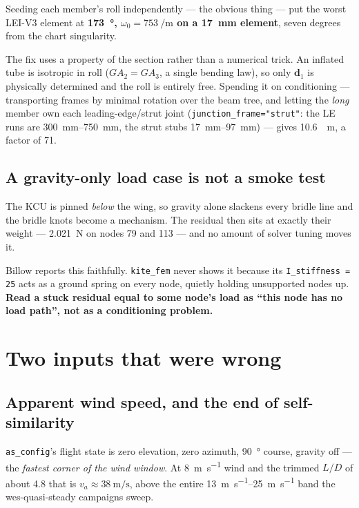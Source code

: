 \documentclass[11pt,a4paper]{article}
\newcommand{\code}[1]{\texttt{\small #1}}
\begin{document}
Seeding each member's roll independently --- the obvious thing --- put the worst
LEI-V3 element at \textbf{\SI{173}{\degree}, $\omega_0 = \SI{753}{\per\metre}$
on a \SI{17}{\milli\metre} element}, seven degrees from the chart singularity.

The fix uses a property of the section rather than a numerical trick. An
inflated tube is isotropic in roll ($GA_2 = GA_3$, a single bending law), so
only $\mathbf{d}_1$ is physically determined and the roll is entirely free.
Spending it on conditioning --- transporting frames by minimal rotation over the
beam tree, and letting the \emph{long} member own each leading-edge/strut joint
(\code{junction\_frame="strut"}: the LE runs are \SIrange{300}{750}{\milli\metre},
the strut stubs \SIrange{17}{97}{\milli\metre}) --- gives
\SI{10.6}{\per\metre}, a factor of 71.

\subsection{A gravity-only load case is not a smoke test}

The KCU is pinned \emph{below} the wing, so gravity alone slackens every bridle
line and the bridle knots become a mechanism. The residual then sits at exactly
their weight --- \SI{2.021}{\newton} on nodes 79 and 113 --- and no amount of
solver tuning moves it.

Billow reports this faithfully. \code{kite\_fem} never shows it because its
\code{I\_stiffness = 25} acts as a ground spring on every node, quietly holding
unsupported nodes up. \textbf{Read a stuck residual equal to some node's load as
``this node has no load path'', not as a conditioning problem.}

\section{Two inputs that were wrong}

\subsection{Apparent wind speed, and the end of self-similarity}
\label{sec:va}

\code{as\_config}'s flight state is zero elevation, zero azimuth,
\SI{90}{\degree} course, gravity off --- the \emph{fastest corner of the wind
window}. At \SI{8}{\metre\per\second} wind and the trimmed $L/D$ of about 4.8
that is $v_a \approx \SI{38}{\metre\per\second}$, above the entire
\SIrange{13}{25}{\metre\per\second} band the wes-quasi-steady campaigns sweep.
\end{document}
